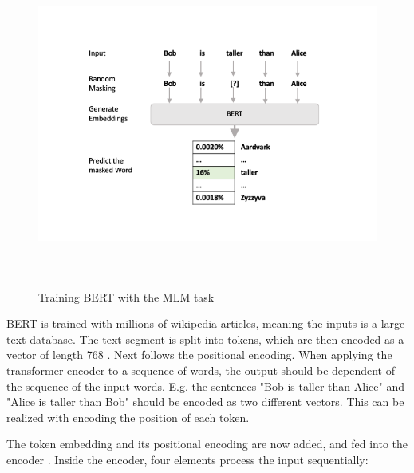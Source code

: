           
             \begin{figure}[h!]
             	
             	\centering
             	\includegraphics[height=10cm]{ Bilder/preprocessing/BERT/BERT-language-modeling-masked-lm.png}
             	\label{fig:mlm}
             	\caption{Training BERT with the MLM task \cite{alammarIllustratedBERTELMo}}
             \end{figure}
            
         
               BERT is trained with millions of wikipedia articles, meaning the inputs is a large text database. The text segment is split into tokens, which are then encoded as a vector of length 768 \cite{BERTEmbeddingLayer}. Next follows the positional encoding. When applying the transformer encoder to a sequence of words, the output should be dependent of the sequence of the input words. E.g. the sentences "Bob is taller than Alice" and "Alice is taller than Bob" should be encoded as two different vectors. This can be realized with encoding the position of each token. 
               

               
               The token embedding and its positional encoding are now added, and fed into the encoder \cite{illustratedTransformer}. Inside the encoder, four elements process the input sequentially:
               
